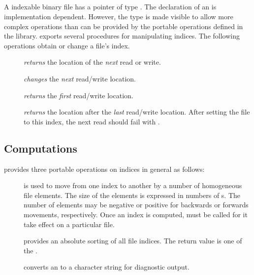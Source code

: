 \subsection{}

A indexable binary file has a pointer of type .
The declaration of an  is implementation dependent.
However, the type is made visible to allow more complex operations
than can be provided by the portable operations defined in the library.
 exports several procedures for manipulating
indices.  The following operations obtain or change
a file's index.
\begin{description}
\item[]
    {\em returns} the location of the {\em next} read or write.
\item[]
    {\em changes} the {\em next} read/write location.
\item[]
    {\em returns} the {\em first} read/write location.
\item[]
    {\em returns} the location after the  {\em last} read/write location.  
    After setting the file to this index, the next read should fail with
    .
\end{description}

\subsection{ Computations}

 provides three portable operations on indices in
general as follows:
\begin{description}
\item[] 
    is used to move from one index to another by a number of homogeneous
    file elements.  The size of the elements is expressed in numbers
    of s.  The number of elements may be negative or positive
    for backwards or forwards movements, respectively.  Once an index
    is computed,  must be called for it take effect
    on a particular file.
\item[]
    provides an absolute sorting of all file indices.  The return
    value is one of the .
\item[]
    converts an  to a character string for diagnostic
    output.
    
\end{description}

